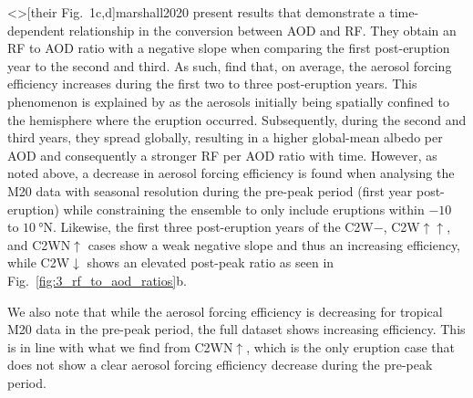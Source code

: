 \documentclass[draft]{agujournal2019}
\begin{document}
  \citeA<>[their Fig.\ 1c,d]{marshall2020} present results that demonstrate a
  time-dependent relationship in the conversion between AOD and RF. They obtain an RF to
  AOD ratio with a negative slope when comparing the first post-eruption year to the
  second and third. As such,  find that, on average, the aerosol
  forcing efficiency increases during the first two to three post-eruption years. This
  phenomenon is explained by  as the aerosols initially being
  spatially confined to the hemisphere where the eruption occurred. Subsequently, during
  the second and third years, they spread globally, resulting in a higher global-mean
  albedo per AOD and consequently a stronger RF per AOD ratio with time. However, as
  noted above, a decrease in aerosol forcing efficiency is found when analysing the M20
  data with seasonal resolution during the pre-peak period (first year post-eruption)
  while constraining the ensemble to only include eruptions within \(-10\) to
  \(\SI{10}{\degree\mathrm{N}}\).  Likewise, the first
  three post-eruption years of the C2W\(-\), C2W\(\uparrow\uparrow\), and
  C2WN\(\uparrow\) cases show a weak negative slope and thus an increasing efficiency,
  while C2W\(\downarrow\) shows an elevated post-peak ratio as seen in
  Fig.~\ref{fig:3_rf_to_aod_ratios}b.

  We also note that while the aerosol forcing efficiency is decreasing for tropical M20
  data in the pre-peak period, the full dataset shows increasing efficiency. This is in
  line with what we find from C2WN\(\uparrow\), which is the only eruption case that
  does not show a clear aerosol forcing efficiency decrease during the pre-peak period.
\end{document}
